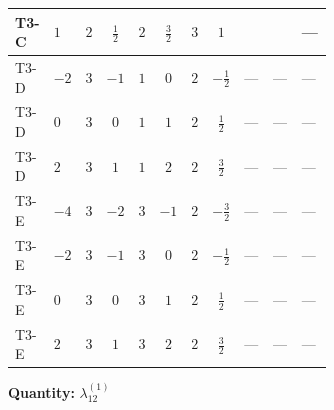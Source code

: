 \documentclass[8pt]{article}
\begin{document}
\begin{landscape}
\begin{longtable}{@{}llcccccc >{\raggedright\arraybackslash}p{0.21\linewidth} >{\raggedright\arraybackslash}p{0.21\linewidth} >{\raggedright\arraybackslash}p{0.21\linewidth}@{}}
\midrule
T3-C & $1$ & $2$ & $\frac{1}{2}$ & $2$ & $\frac{3}{2}$ & $3$ & $1$ & \scriptsize\adjustbox{max width=\linewidth}{$\begin{gathered} +\frac{27 {g_1}^4}{4}\end{gathered}$} & \scriptsize\adjustbox{max width=\linewidth}{$\begin{gathered} +\frac{3 {\lambda_{12}^{(A)}}^2}{4}\end{gathered}$} & --- \\
\midrule
T3-D & $-2$ & $3$ & $-1$ & $1$ & $0$ & $2$ & $-\frac{1}{2}$ & --- & --- & --- \\
\midrule
T3-D & $0$ & $3$ & $0$ & $1$ & $1$ & $2$ & $\frac{1}{2}$ & --- & --- & --- \\
\midrule
T3-D & $2$ & $3$ & $1$ & $1$ & $2$ & $2$ & $\frac{3}{2}$ & --- & --- & --- \\
\midrule
T3-E & $-4$ & $3$ & $-2$ & $3$ & $-1$ & $2$ & $-\frac{3}{2}$ & --- & --- & --- \\
\midrule
T3-E & $-2$ & $3$ & $-1$ & $3$ & $0$ & $2$ & $-\frac{1}{2}$ & --- & --- & --- \\
\midrule
T3-E & $0$ & $3$ & $0$ & $3$ & $1$ & $2$ & $\frac{1}{2}$ & --- & --- & --- \\
\midrule
T3-E & $2$ & $3$ & $1$ & $3$ & $2$ & $2$ & $\frac{3}{2}$ & --- & --- & --- \\
\midrule
\bottomrule
\end{longtable}
\clearpage
\noindent\textbf{Quantity: }$\lambda_{12}^{(1)}$\par\smallskip

\end{landscape}
\end{document}
